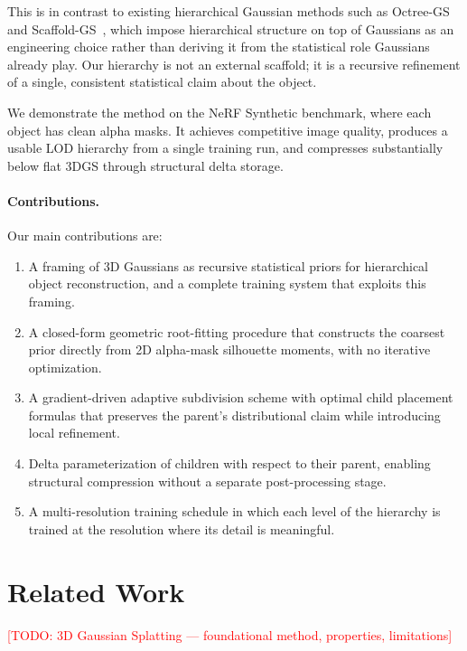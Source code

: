\documentclass[acmtog]{acmart}
\newcommand{\todo}[1]{\textcolor{red}{[TODO: #1]}}
\begin{document}
This is in contrast to existing hierarchical Gaussian methods such as Octree-GS~\cite{octreegs} and Scaffold-GS~\cite{scaffoldgs}, which impose hierarchical structure on top of Gaussians as an engineering choice rather than deriving it from the statistical role Gaussians already play. Our hierarchy is not an external scaffold; it is a recursive refinement of a single, consistent statistical claim about the object.

We demonstrate the method on the NeRF Synthetic benchmark, where each object has clean alpha masks. It achieves competitive image quality, produces a usable LOD hierarchy from a single training run, and compresses substantially below flat 3DGS through structural delta storage.

\paragraph{Contributions.} Our main contributions are:
\begin{enumerate}
    \item A framing of 3D Gaussians as recursive statistical priors for hierarchical object reconstruction, and a complete training system that exploits this framing.
    \item A closed-form geometric root-fitting procedure that constructs the coarsest prior directly from 2D alpha-mask silhouette moments, with no iterative optimization.
    \item A gradient-driven adaptive subdivision scheme with optimal child placement formulas that preserves the parent's distributional claim while introducing local refinement.
    \item Delta parameterization of children with respect to their parent, enabling structural compression without a separate post-processing stage.
    \item A multi-resolution training schedule in which each level of the hierarchy is trained at the resolution where its detail is meaningful.
\end{enumerate}

\section{Related Work}

\todo{3D Gaussian Splatting --- foundational method, properties, limitations}
\end{document}
